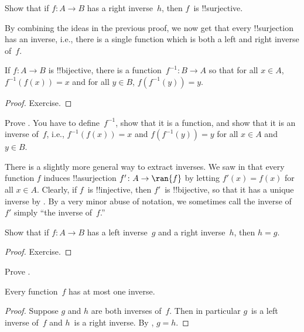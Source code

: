\documentclass[../../../include/open-logic-section]{subfiles}
\begin{document}
\begin{prob}
Show that if $f\colon A \to B$ has a right inverse~$h$, then $f$~is
!!{surjective}.
\end{prob}

\begin{explain}
  By combining the ideas in the previous proof, we now get that every
  !!{surjection} has an inverse, i.e., there is a single function
  which is both a left and right inverse of~$f$.
\end{explain}

\begin{prop}
If $f\colon A \to B$ is !!{bijective}, there is a
function~$f^{-1}\colon B \to A$ so that for all $x \in A$,
$f^{-1}(f(x)) = x$ and for all $y \in B$, $f(f^{-1}(y)) = y$.
\end{prop}

\begin{proof}
Exercise.
\end{proof}

\begin{prob}
Prove . You have to
define~$f^{-1}$, show that it is a function, and show that it is an
inverse of~$f$, i.e., $f^{-1}(f(x)) = x$ and $f(f^{-1}(y)) = y$ for
all $x \in A$ and $y \in B$.
\end{prob}

\begin{explain}
There is a slightly more general way to extract inverses. We saw in
 that every function $f$ induces !!a{surjection} $f'
\colon A \to \ran{f}$ by letting $f'(x) = f(x)$ for all $x \in A$.
Clearly, if $f$~is !!{injective}, then $f'$~is !!{bijective}, so that
it has a unique inverse by . By a very
minor abuse of notation, we sometimes call the inverse of $f'$ simply
``the inverse of~$f$.''
\end{explain}

\begin{prop}%
  Show that if $f\colon A \to B$ has a left inverse~$g$ and a right
  inverse~$h$, then $h = g$.
\end{prop}

\begin{proof}
  Exercise.
\end{proof}

\begin{prob}
  Prove .
\end{prob}

\begin{prop}
Every function~$f$ has at most one inverse.
\end{prop}

\begin{proof}
  Suppose $g$ and $h$ are both inverses of~$f$. Then in particular
  $g$~is a left inverse of~$f$ and $h$~is a right inverse. By
  , $g = h$.
\end{proof}
\end{document}
